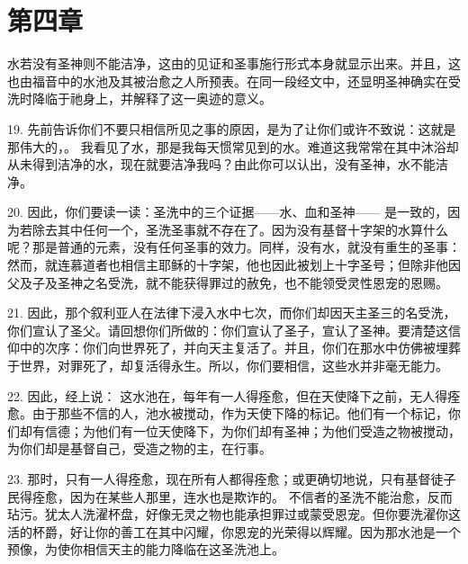 
\section{第四章}

水若没有圣神则不能洁净，这由的见证和圣事施行形式本身就显示出来。并且，这也由福音中的水池及其被治愈之人所预表。在同一段经文中，还显明圣神确实在受洗时降临于祂身上，并解释了这一奥迹的意义。\par

19. 先前告诉你们不要只相信所见之事的原因，是为了让你们或许不致说：这就是那伟大的，。 我看见了水，那是我每天惯常见到的水。难道这我常常在其中沐浴却从未得到洁净的水，现在就要洁净我吗？由此你可以认出，没有圣神，水不能洁净。\par

20. 因此，你们要读一读：圣洗中的三个证据——水、血和圣神—— 是一致的，因为若除去其中任何一个，圣洗圣事就不存在了。因为没有基督十字架的水算什么呢？那是普通的元素，没有任何圣事的效力。同样，没有水，就没有重生的圣事： 然而，就连慕道者也相信主耶稣的十字架，他也因此被划上十字圣号；但除非他因父及子及圣神之名受洗，就不能获得罪过的赦免，也不能领受灵性恩宠的恩赐。\par

21. 因此，那个叙利亚人在法律下浸入水中七次，而你们却因天主圣三的名受洗，你们宣认了圣父。请回想你们所做的：你们宣认了圣子，宣认了圣神。要清楚这信仰中的次序：你们向世界死了，并向天主复活了。并且，你们在那水中仿佛被埋葬于世界，对罪死了，却复活得永生。所以，你们要相信，这些水并非毫无能力。\par

22. 因此，经上说： 这水池在，每年有一人得痊愈，但在天使降下之前，无人得痊愈。由于那些不信的人，池水被搅动，作为天使下降的标记。他们有一个标记，你们却有信德；为他们有一位天使降下，为你们却有圣神；为他们受造之物被搅动，为你们却是基督自己，受造之物的主，在行事。\par

23. 那时，只有一人得痊愈，现在所有人都得痊愈；或更确切地说，只有基督徒子民得痊愈，因为在某些人那里，连水也是欺诈的。 不信者的圣洗不能治愈，反而玷污。犹太人洗濯杯盘，好像无灵之物也能承担罪过或蒙受恩宠。但你要洗濯你这活的杯爵，好让你的善工在其中闪耀，你恩宠的光荣得以辉耀。因为那水池是一个预像，为使你相信天主的能力降临在这圣洗池上。\par

